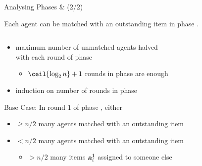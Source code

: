 \begin{frame}{Analysing Phases \phasei{} \& \phaseiii{} (2/2)}
	\adjustfortopblock
	\begin{lemma}
		Each agent can be matched with an outstanding item in phase \phaseiii.
	\end{lemma}
	\begin{columns}[T]
		\begin{column}{0.6\textwidth}
			\begin{itemize}
				\item
				maximum number of unmatched agents halved \\
				with each round of phase \phasei
				\begin{itemize}
					\item
					\(\ceil{\log_2 n} + 1\) rounds in phase \phasei{} are enough
				\end{itemize}

				\item
				induction on number of rounds in phase \phasei
			\end{itemize}
			Base Case: In round \(1\) of phase \phasei, either
			\begin{itemize}
				\item
				\(\ge n/2\) many agents matched with an outstanding item

				\item
				\(< n/2\) many agents matched with an outstanding item
				\begin{itemize}
					\item
					\(> n/2\) many items \(\asgd*{1}\) assigned to someone else


\end{itemize}
\end{itemize}
\end{column}
\end{columns}
\end{frame}
